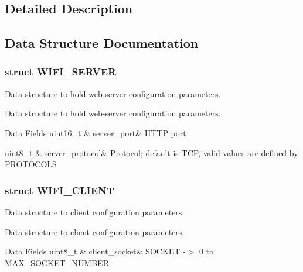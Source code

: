 \subsection{Detailed Description}


\subsection{Data Structure Documentation}
\label{struct_w_i_f_i___s_e_r_v_e_r}
\hypertarget{group__wireless__interface_struct_w_i_f_i___s_e_r_v_e_r}{}
\subsubsection{struct W\+I\+F\+I\+\_\+\+S\+E\+R\+V\+ER}
Data structure to hold web-\/server configuration parameters. 

Data structure to hold web-\/server configuration parameters. \begin{DoxyFields}{Data Fields}
uint16\+\_\+t\hypertarget{group__wireless__interface_a5660b97c4d97618747624b4cdd2b22fa}{}\label{group__wireless__interface_a5660b97c4d97618747624b4cdd2b22fa}
&
server\+\_\+port&
H\+T\+TP port \\
\hline

uint8\+\_\+t\hypertarget{group__wireless__interface_aa088ed786f9bf02e540933707da73c2a}{}\label{group__wireless__interface_aa088ed786f9bf02e540933707da73c2a}
&
server\+\_\+protocol&
Protocol; default is T\+CP, valid values are defined by P\+R\+O\+T\+O\+C\+O\+LS \\
\hline

\end{DoxyFields}
\label{struct_w_i_f_i___c_l_i_e_n_t}
\hypertarget{group__wireless__interface_struct_w_i_f_i___c_l_i_e_n_t}{}
\subsubsection{struct W\+I\+F\+I\+\_\+\+C\+L\+I\+E\+NT}
Data structure to client configuration parameters. 

Data structure to client configuration parameters. \begin{DoxyFields}{Data Fields}
uint8\+\_\+t\hypertarget{group__wireless__interface_a63139c1acb0d498de83a9e77ed1a3fd8}{}\label{group__wireless__interface_a63139c1acb0d498de83a9e77ed1a3fd8}
&
client\+\_\+socket&
S\+O\+C\+K\+ET -\/$>$ 0 to M\+A\+X\+\_\+\+S\+O\+C\+K\+E\+T\+\_\+\+N\+U\+M\+B\+ER \\
\hline

\end{DoxyFields}
\label{struct_h_t_m_l___e_l_e_m_e_n_t___c_h_o_i_c_e}
\hypertarget{group__wireless__interface_struct_h_t_m_l___e_l_e_m_e_n_t___c_h_o_i_c_e}{}
